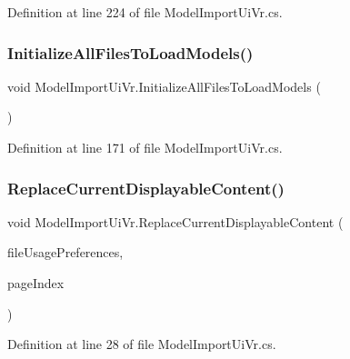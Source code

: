 Definition at line 224 of file Model\+Import\+Ui\+Vr.\+cs.

\mbox{\label{class_model_import_ui_vr_a573f2274f78d0837383d52326aff5174}} 
\subsubsection{\texorpdfstring{InitializeAllFilesToLoadModels()}{InitializeAllFilesToLoadModels()}}
{\footnotesize\ttfamily void Model\+Import\+Ui\+Vr.\+Initialize\+All\+Files\+To\+Load\+Models (\begin{DoxyParamCaption}{ }\end{DoxyParamCaption})}



Definition at line 171 of file Model\+Import\+Ui\+Vr.\+cs.

\mbox{\label{class_model_import_ui_vr_a1c6fd3cd664db5ab76ecc012d4b63d2d}} 
\subsubsection{\texorpdfstring{ReplaceCurrentDisplayableContent()}{ReplaceCurrentDisplayableContent()}}
{\footnotesize\ttfamily void Model\+Import\+Ui\+Vr.\+Replace\+Current\+Displayable\+Content (\begin{DoxyParamCaption}\item[{List$<$ \mbox{\hyperlink{class_file_usage_preference}{File\+Usage\+Preference}} $>$}]{file\+Usage\+Preferences,  }\item[{int}]{page\+Index }\end{DoxyParamCaption})}



Definition at line 28 of file Model\+Import\+Ui\+Vr.\+cs.

\mbox{\label{class_model_import_ui_vr_ac34967a5831f33b6afe216322e2909bb}} 
